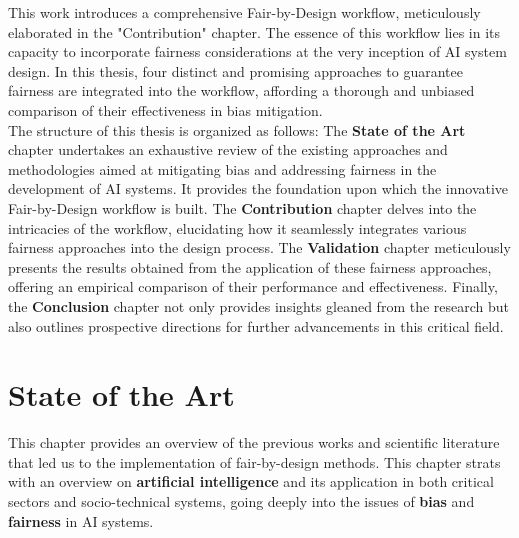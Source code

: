 \documentclass[12pt,a4paper,openright,twoside]{book}
\begin{document}
This work introduces a comprehensive Fair-by-Design workflow, meticulously elaborated in the "Contribution" chapter. The essence of this workflow lies in its capacity to incorporate fairness considerations at the very inception of AI system design. In this thesis, four distinct and promising approaches to guarantee fairness are integrated into the workflow, affording a thorough and unbiased comparison of their effectiveness in bias mitigation. \\
The structure of this thesis is organized as follows: The \textbf{State of the Art} chapter undertakes an exhaustive review of the existing approaches and methodologies aimed at mitigating bias and addressing fairness in the development of AI systems. It provides the foundation upon which the innovative Fair-by-Design workflow is built. The \textbf{Contribution} chapter delves into the intricacies of the workflow, elucidating how it seamlessly integrates various fairness approaches into the design process. The \textbf{Validation} chapter meticulously presents the results obtained from the application of these fairness approaches, offering an empirical comparison of their performance and effectiveness. Finally, the \textbf{Conclusion} chapter not only provides insights gleaned from the research but also outlines prospective directions for further advancements in this critical field.

\chapter{State of the Art} %
\label{chap:background}

This chapter provides an overview of the previous works and scientific literature that led us to the implementation of fair-by-design methods. This chapter strats
with an overview on \textbf{artificial intelligence} and its application in both critical sectors and socio-technical systems, going deeply into the issues of \textbf{bias} and \textbf{fairness} in AI systems.
\end{document}
